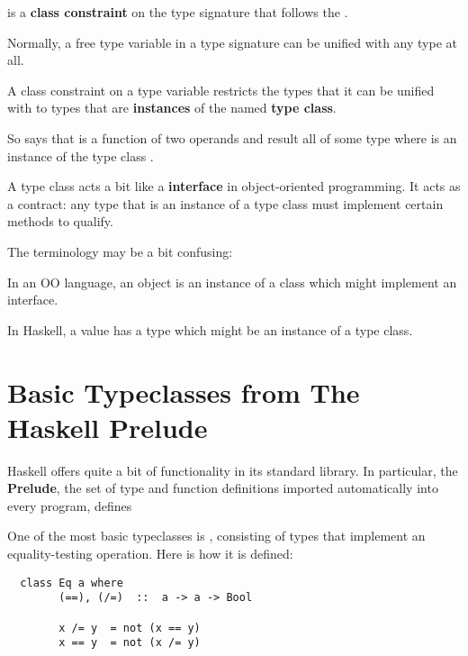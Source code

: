 \begin{notelist}
    \item {} is a \textbf{class constraint} on the type signature that
          follows the \code{=>}. 

    \item Normally, a free type variable in a type signature can be unified with any type at all.
    
    \item A class constraint on a type variable restricts the types that it can be unified with
          to types that are \textbf{instances} of the named \textbf{type class}.

    \item So  says that \code{(+)} is a function of
          two operands and result all of some type  where  is
          an instance of the type class .

    \item A type class acts a bit like a \textbf{interface} in object-oriented programming.
          It acts as a contract: any type that is an instance of a type class must implement 
          certain methods to qualify.

    \item The terminology may be a bit confusing:
    \begin{notelist}
        \item In an OO language, an object is an instance of a class which
              might implement an interface.
        \item In Haskell, a value has a type which might be an instance
              of a type class.
    \end{notelist}
\end{notelist}

\section{Basic Typeclasses from The Haskell Prelude}

Haskell offers quite a bit of functionality in its standard library. In particular, the \textbf{Prelude},
the set of type and function definitions imported automatically into every program, defines 

One of the most basic typeclasses is , consisting of types that implement an equality-testing
operation. Here is how it is defined:

\begin{lstlisting}
  class Eq a where
        (==), (/=)  ::  a -> a -> Bool

        x /= y  = not (x == y)
        x == y  = not (x /= y)
\end{lstlisting}

